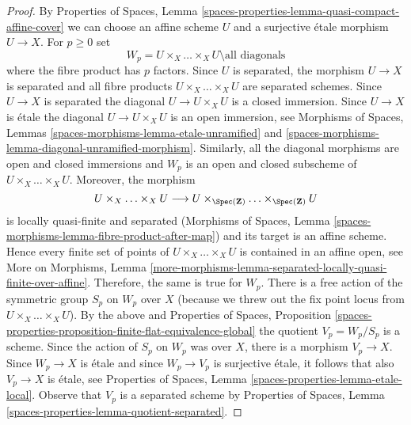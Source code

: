 \begin{proof}
By Properties of Spaces, Lemma
\ref{spaces-properties-lemma-quasi-compact-affine-cover}
we can choose an affine scheme $U$ and a surjective \'etale morphism
$U \to X$. For $p \geq 0$ set
$$
W_p = U \times_X \ldots \times_X U \setminus \text{all diagonals}
$$
where the fibre product has $p$ factors. Since $U$ is separated,
the morphism $U \to X$ is separated and all fibre products
$U \times_X \ldots \times_X U$ are separated schemes. Since $U \to X$ is
separated the diagonal $U \to U \times_X U$ is a closed immersion. Since
$U \to X$ is \'etale the diagonal $U \to U \times_X U$ is an open
immersion, see Morphisms of Spaces, Lemmas
\ref{spaces-morphisms-lemma-etale-unramified} and
\ref{spaces-morphisms-lemma-diagonal-unramified-morphism}.
Similarly, all the diagonal morphisms are open and closed immersions and
$W_p$ is an open and closed subscheme of $U \times_X \ldots \times_X U$.
Moreover, the morphism
$$
U \times_X \ldots \times_X U \longrightarrow
U \times_{\Spec(\mathbf{Z})} \ldots \times_{\Spec(\mathbf{Z})} U
$$
is locally quasi-finite and separated (Morphisms of Spaces,
Lemma \ref{spaces-morphisms-lemma-fibre-product-after-map})
and its target is an affine scheme. Hence every finite set of points of
$U \times_X \ldots \times_X U$ is contained in an affine open, see
More on Morphisms, Lemma
\ref{more-morphisms-lemma-separated-locally-quasi-finite-over-affine}.
Therefore, the same is true for $W_p$.
There is a free action of the symmetric group $S_p$ on $W_p$ over $X$
(because we threw out the fix point locus from
$U \times_X \ldots \times_X U$). By the above and
Properties of Spaces, Proposition
\ref{spaces-properties-proposition-finite-flat-equivalence-global}
the quotient $V_p = W_p/S_p$ is a scheme. Since the action of
$S_p$ on $W_p$ was over $X$, there is a morphism $V_p \to X$.
Since $W_p \to X$ is \'etale and since $W_p \to V_p$ is surjective
\'etale, it follows that also $V_p \to X$ is \'etale, see
Properties of Spaces, Lemma \ref{spaces-properties-lemma-etale-local}.
Observe that $V_p$ is a separated scheme by
Properties of Spaces, Lemma
\ref{spaces-properties-lemma-quotient-separated}.


\end{proof}
